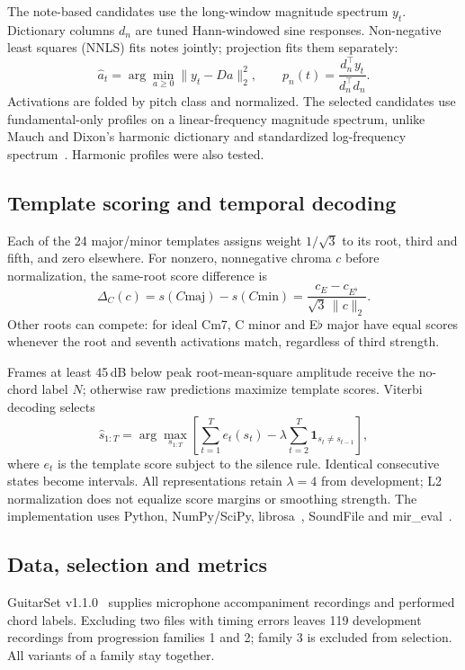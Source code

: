 \documentclass{article}
\begin{document}
The note-based candidates use the long-window magnitude spectrum $y_t$. Dictionary columns $d_n$ are tuned Hann-windowed sine responses. Non-negative least squares (NNLS) fits notes jointly; projection fits them separately:
\begin{equation}
 \hat a_t=\arg\min_{a\geq0}\|y_t-Da\|_2^2,\qquad
 p_n(t)=\frac{d_n^\top y_t}{d_n^\top d_n}.
 \label{eq:notes}
\end{equation}
Activations are folded by pitch class and normalized. The selected candidates use fundamental-only profiles on a linear-frequency magnitude spectrum, unlike Mauch and Dixon's harmonic dictionary and standardized log-frequency spectrum\ \cite{mauch2010}. Harmonic profiles were also tested.

\subsection{Template scoring and temporal decoding}
Each of the 24 major/minor templates assigns weight $1/\sqrt{3}$ to its root, third and fifth, and zero elsewhere. For nonzero, nonnegative chroma $c$ before normalization, the same-root score difference is
\begin{equation}
 \Delta_C(c)=s(C\mathrm{maj})-s(C\mathrm{min})
 =\frac{c_E-c_{E^\flat}}{\sqrt{3}\,\|c\|_2}.
 \label{eq:margin}
\end{equation}
Other roots can compete: for ideal Cm7, C minor and E$\flat$ major have equal scores whenever the root and seventh activations match, regardless of third strength.

Frames at least 45\,dB below peak root-mean-square amplitude receive the no-chord label $N$; otherwise raw predictions maximize template scores. Viterbi decoding selects
\begin{equation}
 \hat s_{1:T}=\arg\max_{s_{1:T}}\left[
 \sum_{t=1}^{T}e_t(s_t)-\lambda\sum_{t=2}^{T}\mathbf{1}_{s_t\ne s_{t-1}}\right],
 \label{eq:decode}
\end{equation}
where $e_t$ is the template score subject to the silence rule. Identical consecutive states become intervals. All representations retain $\lambda=4$ from development; L2 normalization does not equalize score margins or smoothing strength. The implementation uses Python, NumPy/SciPy, librosa\ \cite{mcfee2015}, SoundFile and mir\_eval\ \cite{raffel2014}.

\subsection{Data, selection and metrics}
\label{sec:data}
GuitarSet v1.1.0\ \cite{guitarset} supplies microphone accompaniment recordings and performed chord labels. Excluding two files with timing errors leaves 119 development recordings from progression families 1 and 2; family 3 is excluded from selection. All variants of a family stay together.
\end{document}
